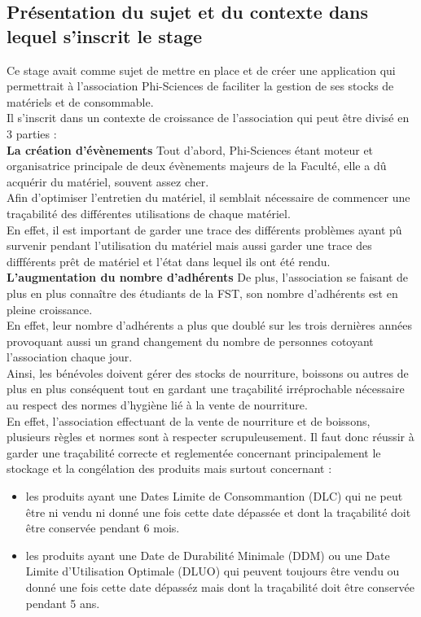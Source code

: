 \documentclass[11pt, twoside]{article}
\begin{document}
\subsection{Présentation du sujet et du contexte dans lequel s'inscrit le stage}
Ce stage avait comme sujet de mettre en place et de créer une application qui permettrait à l'association Phi-Sciences de faciliter la gestion de ses stocks de matériels et de consommable.\\
Il s'inscrit dans un contexte de croissance de l'association qui peut être divisé en 3 parties :
\vspace*{0.2cm}\\
{\large\textbf{La création d'évènements}} Tout d'abord, Phi-Sciences étant moteur et organisatrice principale de deux évènements majeurs de la Faculté, elle a dû acquérir du matériel, souvent assez cher. \\
Afin d'optimiser l'entretien du matériel, il semblait nécessaire de commencer une traçabilité des différentes utilisations de chaque matériel.\\
En effet, il est important de garder une trace des différents problèmes ayant pû survenir pendant l'utilisation du matériel mais aussi garder une trace des diffférents prêt de matériel et l'état dans lequel ils ont été rendu.
\vspace*{0.2cm}\\
{\large\textbf{L'augmentation du nombre d'adhérents}} De plus, l'association se faisant de plus en plus connaître des étudiants de la FST, son nombre d'adhérents est en pleine croissance.\\
En effet, leur nombre d'adhérents a plus que doublé sur les trois dernières années provoquant aussi un grand changement du nombre de personnes cotoyant l'association chaque jour.\\
Ainsi, les bénévoles doivent gérer des stocks de nourriture, boissons ou autres de plus en plus conséquent tout en gardant une traçabilité irréprochable nécessaire au respect des normes d'hygiène lié à la vente de nourriture.\\
En effet, l'association effectuant de la vente de nourriture et de boissons, plusieurs règles et normes sont à respecter scrupuleusement.
Il faut donc réussir à garder une traçabilité correcte et reglementée concernant principalement le stockage et la congélation des produits mais surtout concernant : 
\begin{itemize}
    \item les produits ayant une Dates Limite de Consommantion (DLC) qui ne peut être ni vendu ni donné une fois cette date dépassée et dont la traçabilité doit être conservée pendant 6 mois.
    \item les produits ayant une Date de Durabilité Minimale (DDM) ou une Date Limite d'Utilisation Optimale (DLUO) qui peuvent toujours être vendu ou donné une fois cette date dépasséz mais dont la traçabilité doit être conservée pendant 5 ans.
\end{itemize}
\end{document}
